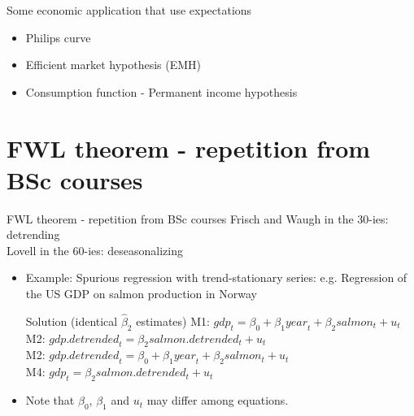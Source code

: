 \documentclass{beamer}
\begin{document}
\begin{frame}{Some economic application that use expectations}
\begin{itemize}
\item Philips curve
\item Efficient market hypothesis (EMH)
\item Consumption function - Permanent income hypothesis
\end{itemize}
\end{frame}


\section{FWL theorem - repetition from BSc courses}
\begin{frame}{FWL theorem - repetition from BSc courses}
Frisch and Waugh in the 30-ies: detrending \\
Lovell in the 60-ies: deseasonalizing
\begin{itemize}
\item Example: Spurious regression with trend-stationary series: e.g. Regression of the US GDP on salmon production in Norway
\begin{block}{Solution (identical $\hat{\beta}_2$ estimates) }
M1: $\textit{gdp}_t = \beta_0 + \beta_1 \textit{year}_t + \beta_2 \textit{salmon}_t + u_t$\\
M2: $\textit{gdp.detrended}_t = \beta_2 \textit{salmon.detrended}_t + u_t$\\
M2: $\textit{gdp.detrended}_t = \beta_0 + \beta_1 \textit{year}_t + \beta_2 \textit{salmon}_t + u_t$\\
M4: $\textit{gdp}_t = \beta_2 \textit{salmon.detrended}_t + u_t$
\end{block}
\item Note that $\beta_0$, $\beta_1$ and $u_t$ may differ among equations.
\end{itemize}
\end{frame}

\end{document}
